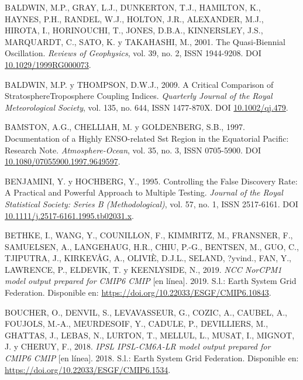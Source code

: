 \documentclass[12pt,oneside,a4paper]{reedthesis}
\newlength{\cslhangindent}
\newenvironment{CSLReferences}[2] %
 {%
  \setlength{\parindent}{0pt}
  \ifodd #1 \everypar{\setlength{\hangindent}{\cslhangindent}}\ignorespaces\fi
  \ifnum #2 > 0
  \setlength{\parskip}{#2\baselineskip}
  \fi
 }%
 {}
\begin{document}
\begin{CSLReferences}{1}{0}
\leavevmode{}%
BALDWIN, M.P., GRAY, L.J., DUNKERTON, T.J., HAMILTON, K., HAYNES, P.H., RANDEL, W.J., HOLTON, J.R., ALEXANDER, M.J., HIROTA, I., HORINOUCHI, T., JONES, D.B.A., KINNERSLEY, J.S., MARQUARDT, C., SATO, K. y TAKAHASHI, M., 2001. The Quasi-Biennial Oscillation. \emph{Reviews of Geophysics}, vol. 39, no. 2, ISSN 1944-9208. DOI \href{https://doi.org/10.1029/1999RG000073}{10.1029/1999RG000073}.

\leavevmode{}%
BALDWIN, M.P. y THOMPSON, D.W.J., 2009. A Critical Comparison of Stratosphere\textendash Troposphere Coupling Indices. \emph{Quarterly Journal of the Royal Meteorological Society}, vol. 135, no. 644, ISSN 1477-870X. DOI \href{https://doi.org/10.1002/qj.479}{10.1002/qj.479}.

\leavevmode{}%
BAMSTON, A.G., CHELLIAH, M. y GOLDENBERG, S.B., 1997. Documentation of a Highly {ENSO}-related Sst Region in the Equatorial Pacific: {Research} Note. \emph{Atmosphere-Ocean}, vol. 35, no. 3, ISSN 0705-5900. DOI \href{https://doi.org/10.1080/07055900.1997.9649597}{10.1080/07055900.1997.9649597}.

\leavevmode{}%
BENJAMINI, Y. y HOCHBERG, Y., 1995. Controlling the {False Discovery Rate}: {A Practical} and {Powerful Approach} to {Multiple Testing}. \emph{Journal of the Royal Statistical Society: Series B (Methodological)}, vol. 57, no. 1, ISSN 2517-6161. DOI \href{https://doi.org/10.1111/j.2517-6161.1995.tb02031.x}{10.1111/j.2517-6161.1995.tb02031.x}.

\leavevmode{}%
BETHKE, I., WANG, Y., COUNILLON, F., KIMMRITZ, M., FRANSNER, F., SAMUELSEN, A., LANGEHAUG, H.R., CHIU, P.-G., BENTSEN, M., GUO, C., TJIPUTRA, J., KIRKEVÅG, A., OLIVIÈ, D.J.L., SELAND, ?yvind., FAN, Y., LAWRENCE, P., ELDEVIK, T. y KEENLYSIDE, N., 2019. \emph{NCC NorCPM1 model output prepared for CMIP6 CMIP} {[}en línea{]}. 2019. S.l.: Earth System Grid Federation. Disponible en: \url{https://doi.org/10.22033/ESGF/CMIP6.10843}.

\leavevmode{}%
BOUCHER, O., DENVIL, S., LEVAVASSEUR, G., COZIC, A., CAUBEL, A., FOUJOLS, M.-A., MEURDESOIF, Y., CADULE, P., DEVILLIERS, M., GHATTAS, J., LEBAS, N., LURTON, T., MELLUL, L., MUSAT, I., MIGNOT, J. y CHERUY, F., 2018. \emph{IPSL IPSL-CM6A-LR model output prepared for CMIP6 CMIP} {[}en línea{]}. 2018. S.l.: Earth System Grid Federation. Disponible en: \url{https://doi.org/10.22033/ESGF/CMIP6.1534}.


\end{CSLReferences}
\end{document}
